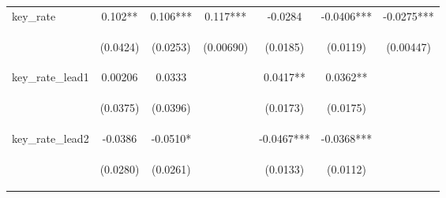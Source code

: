 \documentclass[]{article}
\begin{document}
\begin{center}
\begin{tabular}{lcccccc}
key\_rate & 0.102** & 0.106*** & 0.117*** & -0.0284 & -0.0406*** & -0.0275*** \\
\vspace{4pt} & \begin{footnotesize}(0.0424)\end{footnotesize} & \begin{footnotesize}(0.0253)\end{footnotesize} & \begin{footnotesize}(0.00690)\end{footnotesize} & \begin{footnotesize}(0.0185)\end{footnotesize} & \begin{footnotesize}(0.0119)\end{footnotesize} & \begin{footnotesize}(0.00447)\end{footnotesize} \\
key\_rate\_lead1 & 0.00206 & 0.0333 &  & 0.0417** & 0.0362** &  \\
\vspace{4pt} & \begin{footnotesize}(0.0375)\end{footnotesize} & \begin{footnotesize}(0.0396)\end{footnotesize} & \begin{footnotesize}\end{footnotesize} & \begin{footnotesize}(0.0173)\end{footnotesize} & \begin{footnotesize}(0.0175)\end{footnotesize} & \begin{footnotesize}\end{footnotesize} \\
key\_rate\_lead2 & -0.0386 & -0.0510* &  & -0.0467*** & -0.0368*** &  \\
\vspace{4pt} & \begin{footnotesize}(0.0280)\end{footnotesize} & \begin{footnotesize}(0.0261)\end{footnotesize} & \begin{footnotesize}\end{footnotesize} & \begin{footnotesize}(0.0133)\end{footnotesize} & \begin{footnotesize}(0.0112)\end{footnotesize} & \begin{footnotesize}\end{footnotesize} \\

\end{tabular}
\end{center}
\end{document}
